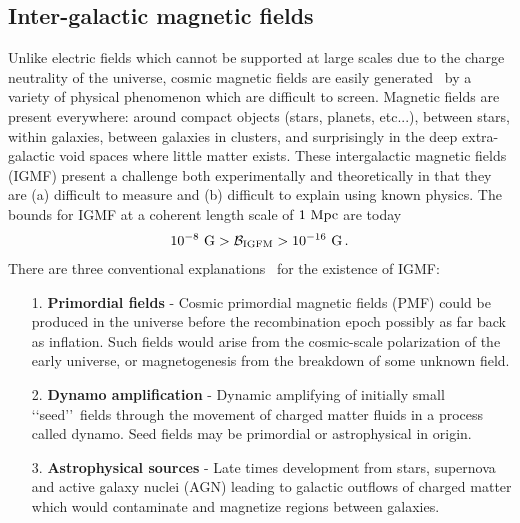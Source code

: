 \documentclass[a4paper]{article}
\begin{document}
\subsection{Inter-galactic magnetic fields}\label{sec:IGMF}
\noindent Unlike electric fields which cannot be supported at large scales due to the charge neutrality of the universe, cosmic magnetic fields are easily generated~\cite{kronberg1994extragalactic,gaensler2004origin,durrer2013cosmological} by a variety of physical phenomenon which are difficult to screen. Magnetic fields are present everywhere: around compact objects (stars, planets, etc...), between stars, within galaxies, between galaxies in clusters, and surprisingly in the deep extra-galactic void spaces where little matter exists. These intergalactic magnetic fields (IGMF) present a challenge both experimentally and theoretically in that they are (a) difficult to measure and (b) difficult to explain using known physics. The bounds for IGMF at a coherent length scale of $1{\rm\ Mpc}$ are today~\cite{neronov2010evidence,taylor2011extragalactic,vernstrom2021discovery}
\begin{align}
    10^{-8}{\rm\ G}>\mathcal{B}_{\rm IGFM}>10^{-16}{\rm\ G}\,.
\end{align}
There are three conventional explanations~\cite{batista2021gammaray} for the existence of IGMF:
\begin{itemize}
    \item [1.] \textbf{Primordial fields} - Cosmic primordial magnetic fields (PMF) could be produced in the universe before the recombination epoch possibly as far back as inflation. Such fields would arise from the cosmic-scale polarization of the early universe, or magnetogenesis from the breakdown of some unknown field.
    \item [2.] \textbf{Dynamo amplification} - Dynamic amplifying of initially small \lq\lq seed\rq\rq\ fields through the movement of charged matter fluids in a process called dynamo. Seed fields may be primordial or astrophysical in origin.
    \item [3.] \textbf{Astrophysical sources} - Late times development from stars, supernova and active galaxy nuclei (AGN) leading to galactic outflows of charged matter which would contaminate and magnetize regions between galaxies.
\end{itemize}
\end{document}
